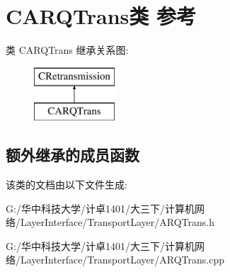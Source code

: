 \hypertarget{class_c_a_r_q_trans}{}\section{C\+A\+R\+Q\+Trans类 参考}
\label{class_c_a_r_q_trans}
类 C\+A\+R\+Q\+Trans 继承关系图\+:\begin{figure}[H]
\begin{center}
\leavevmode
\includegraphics[height=2.000000cm]{class_c_a_r_q_trans}
\end{center}
\end{figure}
\subsection*{额外继承的成员函数}


该类的文档由以下文件生成\+:\begin{DoxyCompactItemize}
\item 
G\+:/华中科技大学/计卓1401/大三下/计算机网络/\+Layer\+Interface/\+Transport\+Layer/A\+R\+Q\+Trans.\+h\item 
G\+:/华中科技大学/计卓1401/大三下/计算机网络/\+Layer\+Interface/\+Transport\+Layer/A\+R\+Q\+Trans.\+cpp\end{DoxyCompactItemize}
